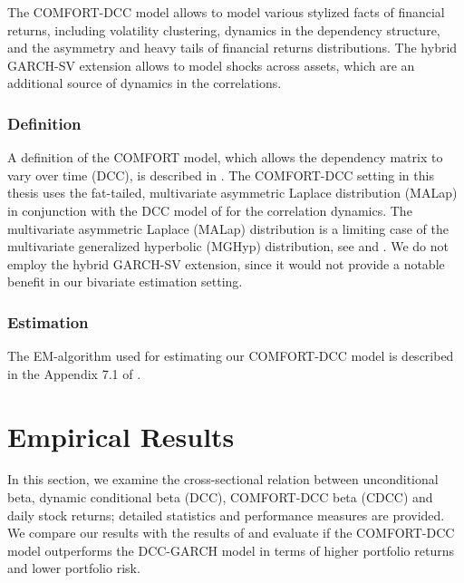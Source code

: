 \documentclass[11pt,a4paper]{article}
\begin{document}
The COMFORT-DCC model allows to model various stylized facts of financial returns, including volatility clustering, dynamics in the dependency structure, and the asymmetry and heavy tails of financial returns distributions. The hybrid GARCH-SV extension allows to model shocks across assets, which are an additional source of dynamics in the correlations.


\subsubsection{Definition}

A definition of the COMFORT model, which allows the dependency matrix to vary over time (DCC), is described in . The COMFORT-DCC setting in this thesis uses the fat-tailed, multivariate asymmetric Laplace distribution (MALap) in conjunction with the DCC model of  for the correlation dynamics. The multivariate asymmetric Laplace (MALap) distribution is a limiting case of the multivariate generalized hyperbolic (MGHyp) distribution, see  and . We do not employ the hybrid GARCH-SV extension, since it would not provide a notable benefit in our bivariate estimation setting.


\subsubsection{Estimation}

The EM-algorithm used for estimating our COMFORT-DCC model is described in the Appendix 7.1 of .








\newpage
\section{Empirical Results}

In this section, we examine the cross-sectional relation between unconditional beta, dynamic conditional beta (DCC), COMFORT-DCC beta (CDCC) and daily stock returns; detailed statistics and performance measures are provided. We compare our results with the results of  and evaluate if the COMFORT-DCC model outperforms the DCC-GARCH model in terms of higher portfolio returns and lower portfolio risk.
\end{document}
